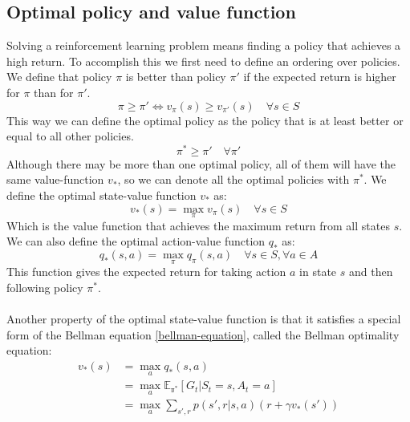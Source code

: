 \subsection{Optimal policy and value function}
Solving a reinforcement learning problem means finding a policy that achieves a high return. To accomplish this we first need to define an ordering over policies. We define that policy $\pi$ is better than policy $\pi'$ if the expected return is higher for $\pi$ than for $\pi'$.
\begin{equation}
    \pi \geq \pi' \iff v_{\pi}(s) \geq v_{\pi'}(s) \quad \forall s \in S
    \label{policy-ordering}
\end{equation}
This way we can define the optimal policy as the policy that is at least better or equal to all other policies.
\begin{equation}
    \pi^* \geq \pi' \quad \forall \pi'
    \label{optimal-policy}
\end{equation}
Although there may be more than one optimal policy, all of them will have the same value-function $v_*$, so we can denote all the optimal policies with $\pi^*$.
We define the optimal state-value function $v_*$ as:
\begin{equation}
    v_*(s) = \max_{\pi} v_{\pi}(s) \quad \forall s \in S
    \label{optimal-value-function}
\end{equation}
Which is the value function that achieves the maximum return from all states $s$. We can also define the optimal action-value function $q_*$ as:
\begin{equation}
    q_*(s, a) = \max_{\pi} q_{\pi}(s, a) \quad \forall s \in S, \forall a \in A
    \label{optimal-action-value-function}
\end{equation}
This function gives the expected return for taking action $a$ in state $s$ and then following policy $\pi^*$.\\\\
Another property of the optimal state-value function is that it satisfies a special form of the Bellman equation \ref{bellman-equation}, called the Bellman optimality equation:
\begin{equation}
    \begin{split}
        v_{*}(s) & = \max_a q_*(s, a) \\
        & = \max_a \mathds{E_{\pi^*}}[G_t | S_t = s, A_t = a] \\
        & = \max_a \sum_{s', r} p(s', r | s, a) (r + \gamma v_*(s'))
    \end{split}
    \label{bellman-optimality-equation}
\end{equation}
